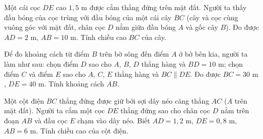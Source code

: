 

\begin{bt}%
	Một cái cọc $DE$ cao $1{,}5\text{ m}$ được cắm thẳng đứng trên mặt đất. Người ta thấy đầu bóng của cọc trùng với đầu bóng của một cái cây $BC$ (cây và cọc cùng vuông góc với mặt đất, chân cọc $D$ nằm giữa đầu bóng $A$ và gốc cây $B$). Đo được $AD=2\text{ m}$, $AB=10\text{ m}$. Tính chiều cao $BC$ của cây.
\end{bt}

\begin{bt}%
	Để đo khoảng cách từ điểm $B$ trên bờ sông đến điểm $A$ ở bờ bên kia, người ta làm như sau: chọn điểm $D$ sao cho $A$, $B$, $D$ thẳng hàng và $BD=10\text{ m}$; chọn điểm $C$ và điểm $E$ sao cho $A$, $C$, $E$ thẳng hàng và $BC\parallel DE$. Đo được $BC=30\text{ m}$, $DE=40\text{ m}$. Tính khoảng cách $AB$.
\end{bt}

\begin{bt}%
	Một cột điện $BC$ thẳng đứng được giữ bởi sợi dây néo căng thẳng $AC$ ($A$ trên mặt đất). Người ta cắm một cọc $DE$ thẳng đứng sao cho chân cọc $D$ nằm trên đoạn $AB$ và đầu cọc $E$ chạm vào dây néo. Biết $AD=1{,}2\text{ m}$, $DE=0{,}8\text{ m}$, $AB=6\text{ m}$. Tính chiều cao của cột điện.
\end{bt}

